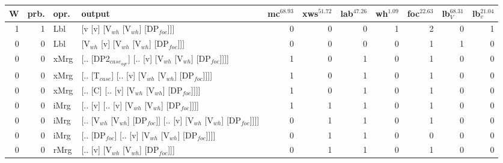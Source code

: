 \begin{tabularx}{\linewidth}{rrlXrrrrrrr}
\hline
   W &   prb. & opr.   & output                                                      &   mc$^{68.93}$ &   xws$^{51.72}$ &   lab$^{47.26}$ &   wh$^{1.09}$ &   foc$^{22.63}$ &   lb$_{V}^{68.31}$ &   lb$_{v}^{21.04}$ \\
\hline
   1 &   1 & Lbl  & [v [v] [V$_{wh}$ [V$_{wh}$] [DP$_{foc}$]]]                              &            0 &             0 &             0 &            1 &             2 &              0 &              1 \\
   0 &   0 & Lbl  & [V$_{wh}$ [v] [V$_{wh}$ [V$_{wh}$] [DP$_{foc}$]]]                           &            0 &             0 &             0 &            0 &             1 &              1 &              0 \\
   0 &   0 & xMrg & [.. [DP2$_{case_{agr}}$] [.. [v] [V$_{wh}$ [V$_{wh}$] [DP$_{foc}$]]]]         &            1 &             0 &             1 &            0 &             1 &              0 &              0 \\
   0 &   0 & xMrg & [.. [T$_{case}$] [.. [v] [V$_{wh}$ [V$_{wh}$] [DP$_{foc}$]]]]               &            1 &             0 &             1 &            0 &             1 &              0 &              0 \\
   0 &   0 & xMrg & [.. [C] [.. [v] [V$_{wh}$ [V$_{wh}$] [DP$_{foc}$]]]]                    &            1 &             0 &             1 &            0 &             1 &              0 &              0 \\
   0 &   0 & iMrg & [.. [v] [.. [v] [V$_{wh}$ [V$_{wh}$] [DP$_{foc}$]]]]                    &            1 &             1 &             1 &            0 &             1 &              0 &              0 \\
   0 &   0 & iMrg & [.. [V$_{wh}$ [V$_{wh}$] [DP$_{foc}$]] [.. [v] [V$_{wh}$ [V$_{wh}$] [DP$_{foc}$]]]] &            0 &             1 &             1 &            0 &             1 &              0 &              0 \\
   0 &   0 & iMrg & [.. [DP$_{foc}$] [.. [v] [V$_{wh}$ [V$_{wh}$] [DP$_{foc}$]]]]               &            0 &             1 &             1 &            0 &             0 &              0 &              0 \\
   0 &   0 & rMrg & [.. [v] [V$_{wh}$ [V$_{wh}$] [DP$_{foc}$]]]                             &            0 &             1 &             1 &            0 &             1 &              0 &              0 \\
\hline
\end{tabularx}\endgroup\\
